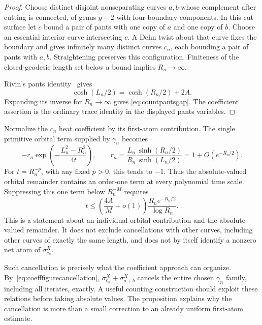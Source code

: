 \documentclass[11pt,a4paper]{article}
\numberwithin{equation}{section}
\theoremstyle{definition}
\theoremstyle{remark}
\begin{document}
\begin{proof}
Choose distinct disjoint nonseparating curves $a,b$ whose complement
after cutting is connected, of genus $g-2$ with four boundary
components. In this cut surface let $c$ bound a pair of pants with
one copy of $a$ and one copy of $b$. Choose an essential interior
curve intersecting $c$. A Dehn twist about that curve fixes the boundary
and gives infinitely many distinct curves $c_n$, each bounding a
pair of pants with $a,b$. Straightening preserves this configuration.
Finiteness of the closed-geodesic length set below a bound implies
$R_n\to\infty$.

Rivin's pants identity~\cite[Theorem 1.3]{RivinFigures} gives
\[
 \cosh(L_n/2)=\cosh(R_n/2)+2A.
\]
Expanding its inverse for $R_n\to\infty$ gives
\eqref{eq:countpantsgap}. The coefficient assertion is the ordinary
trace identity in the displayed pants variables.
\end{proof}

Normalize the $c_n$ heat coefficient by its first-atom contribution.
The single primitive orbital term supplied by $\gamma_n$ becomes
\begin{equation}
 -r_n\exp\!\left(-\frac{L_n^2-R_n^2}{4t}\right),
 \qquad
 r_n=\frac{L_n}{R_n}
       \frac{\sinh(R_n/2)}{\sinh(L_n/2)}
     =1+O(e^{-R_n/2}).
 \label{eq:countnormalizedpants}
\end{equation}
For $t=R_n^{-p}$, with any fixed $p>0$, this tends to $-1$.
Thus the absolute-valued orbital remainder contains an order-one
term at every polynomial time scale. Suppressing this one term
below $R_n^{-M}$ requires
\begin{equation}
 t\leq\left(\frac{4A}{M}+o(1)\right)
       \frac{R_n e^{-R_n/2}}{\log R_n}.
 \label{eq:countnecessarytime}
\end{equation}
This is a statement about an individual orbital contribution and
the absolute-valued remainder. It does not exclude cancellations
with other curves, including other curves of exactly the same
length, and does not by itself identify a nonzero net atom of
$\sigma_{c_n}^X$.

Such cancellation is precisely what the coefficient approach can
organize. By~\eqref{eq:coefffigurecancellation},
$\sigma_{c_n}^X+\sigma_{a+b}^X$ cancels the entire chosen
$\gamma_n$ family, including all iterates, exactly. A useful
counting construction should exploit these relations before taking
absolute values. The proposition explains why the cancellation is
more than a small correction to an already uniform first-atom
estimate.
\end{document}
